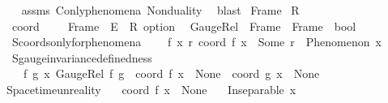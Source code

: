 \begin{isabellebody}
\ \ %
\endisadelimproof
%
\isatagproof
{}\isamarkupfalse%
\ assms\ C{}{\isacharunderscore}{\kern0pt}only{\isacharunderscore}{\kern0pt}phenomena\ Nonduality\ \isamarkupfalse%
\ blast%
\endisatagproof
{\isafoldproof}%
%
\isadelimproof
%
\endisadelimproof
%
\isadelimdocument
%
\endisadelimdocument
%
\isatagdocument
%
\isamarkuptrue%
%
\endisatagdocument
{\isafolddocument}%
%
\isadelimdocument
%
\endisadelimdocument
{}\isamarkupfalse%
\ Frame\isanewline
{}\isamarkupfalse%
\ R{}\ \ \ \ \ \isanewline
\isanewline
{}\isamarkupfalse%
\isanewline
\ \ coord\ \ \ \ {\isacharcolon}{\kern0pt}{\isacharcolon}{\kern0pt}\ {\isachardoublequoteopen}Frame\ {\isasymRightarrow}\ E\ {\isasymRightarrow}\ R{}\ option{\isachardoublequoteclose}\isanewline
\ \ GaugeRel\ {\isacharcolon}{\kern0pt}{\isacharcolon}{\kern0pt}\ {\isachardoublequoteopen}Frame\ {\isasymRightarrow}\ Frame\ {\isasymRightarrow}\ bool{\isachardoublequoteclose}\isanewline
\isanewline
{}\isamarkupfalse%
\ \isanewline
\ \ S{}{\isacharunderscore}{\kern0pt}coords{\isacharunderscore}{\kern0pt}only{\isacharunderscore}{\kern0pt}for{\isacharunderscore}{\kern0pt}phenomena{\isacharcolon}{\kern0pt}\isanewline
\ \ \ \ {\isachardoublequoteopen}{\isasymforall}f\ x\ r{\isachardot}{\kern0pt}\ coord\ f\ x\ {\isacharequal}{\kern0pt}\ Some\ r\ {\isasymlongrightarrow}\ Phenomenon\ x{\isachardoublequoteclose}\ \isanewline
\ \ S{}{\isacharunderscore}{\kern0pt}gauge{\isacharunderscore}{\kern0pt}invariance{\isacharunderscore}{\kern0pt}definedness{\isacharcolon}{\kern0pt}\isanewline
\ \ \ \ {\isachardoublequoteopen}{\isasymforall}f\ g\ x{\isachardot}{\kern0pt}\ GaugeRel\ f\ g\ {\isasymlongrightarrow}\ {\isacharparenleft}{\kern0pt}coord\ f\ x\ {\isacharequal}{\kern0pt}\ None\ {\isasymlongleftrightarrow}\ coord\ g\ x\ {\isacharequal}{\kern0pt}\ None{\isacharparenright}{\kern0pt}{\isachardoublequoteclose}\isanewline
\isanewline
{}\isamarkupfalse%
\ Spacetime{\isacharunderscore}{\kern0pt}unreality{\isacharcolon}{\kern0pt}\isanewline
\ \ \ {\isachardoublequoteopen}coord\ f\ x\ {\isasymnoteq}\ None{\isachardoublequoteclose}\isanewline
\ \ \ {\isachardoublequoteopen}Inseparable\ x\ {\isasymOmega}{\isachardoublequoteclose}\isanewline
%
\isadelimproof
%
\endisadelimproof
%
\isatagproof

\end{isabellebody}
